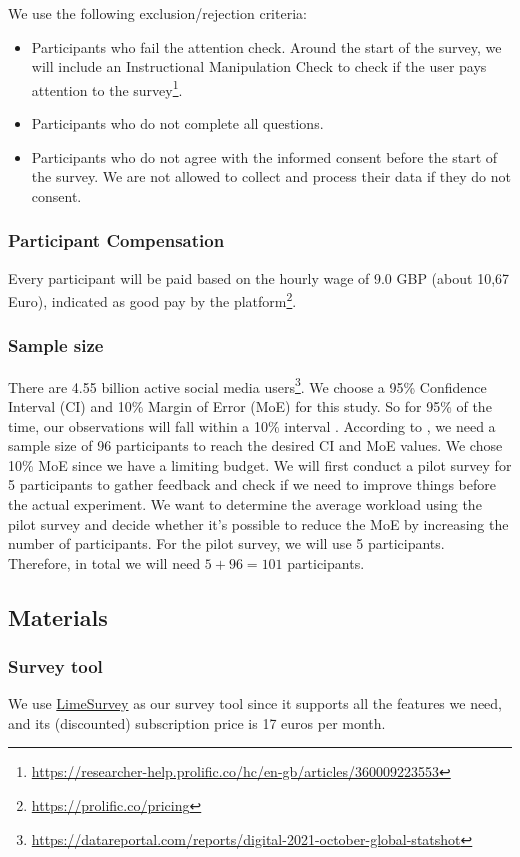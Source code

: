 \documentclass[a4paper]{article}
\begin{document}
We use the following exclusion/rejection criteria:
\begin{itemize}
    \item Participants who fail the attention check. Around the start of the survey, we will include an Instructional Manipulation Check to check if the user pays attention to the survey\footnote{\url{https://researcher-help.prolific.co/hc/en-gb/articles/360009223553}}.
    \item Participants who do not complete all questions.
    \item Participants who do not agree with the informed consent before the start of the survey. We are not allowed to collect and process their data if they do not consent.
\end{itemize}

\subsubsection{Participant Compensation}
Every participant will be paid based on the hourly wage of 9.0 GBP (about 10,67 Euro), indicated as good pay by the platform\footnote{\url{https://prolific.co/pricing}}.

\subsubsection{Sample size}
There are 4.55 billion active social media users\footnote{\url{https://datareportal.com/reports/digital-2021-october-global-statshot}}. We choose a 95\% Confidence Interval (CI) and 10\% Margin of Error (MoE) for this study. So for 95\% of the time, our observations will fall within a 10\% interval \cite{olson2014ways}. According to \cite{olson2014ways}, we need a sample size of 96 participants to reach the desired CI and MoE values. We chose 10\% MoE since we have a limiting budget. We will first conduct a pilot survey for 5 participants to gather feedback and check if we need to improve things before the actual experiment. We want to determine the average workload using the pilot survey and decide whether it’s possible to reduce the MoE by increasing the number of participants. For the pilot survey, we will use 5 participants. Therefore, in total we will need $5+96 = 101$ participants.

\subsection{Materials}
\subsubsection{Survey tool}
We use \href{https://www.limesurvey.org}{LimeSurvey} as our survey tool since it supports all the features we need, and its (discounted) subscription price is 17 euros per month.
\end{document}
